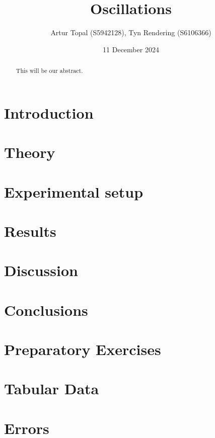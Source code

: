 \documentclass[a4paper,12pt]{article}
\title{Oscillations}
\author{Artur Topal (S5942128), Tyn Rendering (S6106366)}
\date{11 December 2024}
\begin{document}
\maketitle

\begin{abstract}
This will be our abstract.
\end{abstract}

\break
\tableofcontents
\break
\section{Introduction}


\section{Theory} \label{sec:theory}


\section{Experimental setup}


\section{Results}


\section{Discussion}


\section{Conclusions}


\appendix
\section{Preparatory Exercises} \label{appendix:preps}

 
\section{Tabular Data} \label{appendix:data}


\section{Errors} \label{appendix:errors}

\end{document}

